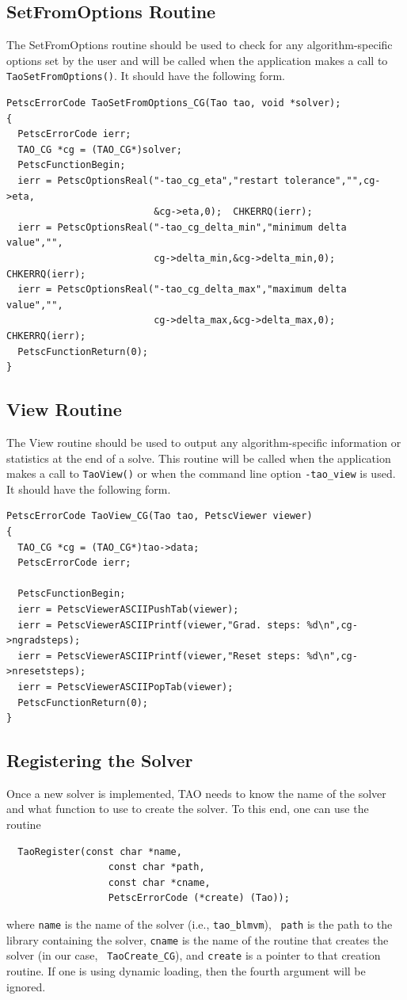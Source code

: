 \documentclass[]{book}
\begin{document}
\subsection{SetFromOptions Routine}
The SetFromOptions routine should be used to check for any 
algorithm-specific options set 
by the user and will be called when the application makes a call
to {\tt TaoSetFromOptions()}.  It should have the following form.
\begin{verbatim}
PetscErrorCode TaoSetFromOptions_CG(Tao tao, void *solver);
{
  PetscErrorCode ierr;
  TAO_CG *cg = (TAO_CG*)solver;
  PetscFunctionBegin;
  ierr = PetscOptionsReal("-tao_cg_eta","restart tolerance","",cg->eta,
                          &cg->eta,0);  CHKERRQ(ierr);
  ierr = PetscOptionsReal("-tao_cg_delta_min","minimum delta value","",
                          cg->delta_min,&cg->delta_min,0); CHKERRQ(ierr);
  ierr = PetscOptionsReal("-tao_cg_delta_max","maximum delta value","",
                          cg->delta_max,&cg->delta_max,0); CHKERRQ(ierr);
  PetscFunctionReturn(0);
}
\end{verbatim}

\subsection{View Routine}
The View routine should be used to output any algorithm-specific information
or statistics at the end of a solve.
This routine will be called when the application makes a call to 
{\tt TaoView()} or when the command line option {\tt -tao\_view} is used.
It should have the following form.
\begin{verbatim}
PetscErrorCode TaoView_CG(Tao tao, PetscViewer viewer)
{ 
  TAO_CG *cg = (TAO_CG*)tao->data;
  PetscErrorCode ierr;

  PetscFunctionBegin;
  ierr = PetscViewerASCIIPushTab(viewer);
  ierr = PetscViewerASCIIPrintf(viewer,"Grad. steps: %d\n",cg->ngradsteps);
  ierr = PetscViewerASCIIPrintf(viewer,"Reset steps: %d\n",cg->nresetsteps);
  ierr = PetscViewerASCIIPopTab(viewer);
  PetscFunctionReturn(0);
}
\end{verbatim}


\subsection{Registering the Solver}
Once a new solver is implemented, TAO needs to know the name of
the solver and what function to use to create the solver.  To this end, one
can use the routine
\begin{verbatim}
  TaoRegister(const char *name, 
                  const char *path,
                  const char *cname, 
                  PetscErrorCode (*create) (Tao));
\end{verbatim}
\noindent
where {\tt name} is the name of the solver (i.e., {\tt tao\_blmvm}), {\tt
path} is the path to the library containing the solver, {\tt cname} is the
name of the routine that creates the solver (in our case, {\tt
  TaoCreate\_CG}), and {\tt create} is a pointer to that creation
routine.  If one is using dynamic loading, then the fourth argument will be
ignored. 
\end{document}
